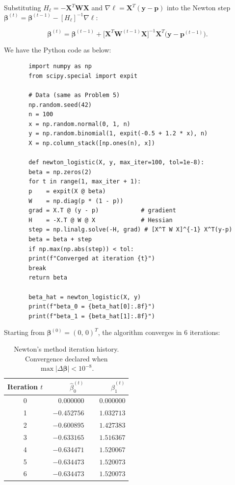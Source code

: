 \documentclass[letterpaper]{article}
\begin{document}
		
		Substituting $H_\ell = -\mathbf{X}^T\mathbf{W}\mathbf{X}$ and
		$\nabla\ell = \mathbf{X}^T(\mathbf{y}-\mathbf{p})$ into the Newton step
		$\boldsymbol{\beta}^{(t)} = \boldsymbol{\beta}^{(t-1)} - [H_\ell]^{-1}\nabla\ell$:
		
		\[
		\boldsymbol{\beta}^{(t)}
		= \boldsymbol{\beta}^{(t-1)}
		+ \bigl[\mathbf{X}^T\mathbf{W}^{(t-1)}\mathbf{X}\bigr]^{-1}
		\mathbf{X}^T\!\bigl(\mathbf{y}-\mathbf{p}^{(t-1)}\bigr).
		\]
		
		We have the Python code as below:

		\begin{lstlisting}
       import numpy as np
       from scipy.special import expit
       
       # Data (same as Problem 5)
       np.random.seed(42)
       n = 100
       x = np.random.normal(0, 1, n)
       y = np.random.binomial(1, expit(-0.5 + 1.2 * x), n)
       X = np.column_stack([np.ones(n), x])
       
       def newton_logistic(X, y, max_iter=100, tol=1e-8):
       beta = np.zeros(2)
       for t in range(1, max_iter + 1):
       p    = expit(X @ beta)
       W    = np.diag(p * (1 - p))
       grad = X.T @ (y - p)            # gradient
       H    = -X.T @ W @ X             # Hessian
       step = np.linalg.solve(-H, grad) # [X^T W X]^{-1} X^T(y-p)
       beta = beta + step
       if np.max(np.abs(step)) < tol:
       print(f"Converged at iteration {t}")
       break
       return beta
       
       beta_hat = newton_logistic(X, y)
       print(f"beta_0 = {beta_hat[0]:.8f}")
       print(f"beta_1 = {beta_hat[1]:.8f}")
		\end{lstlisting}

		
		Starting from $\boldsymbol{\beta}^{(0)} = (0,\,0)^T$, the algorithm converges
		in 6 iterations:
		
		\begin{table}[H]
			\centering
			\begin{tabular}{crr}
				\toprule
				Iteration $t$ & $\hat{\beta}_0^{(t)}$ & $\hat{\beta}_1^{(t)}$ \\
				\midrule
				0 & $\phantom{-}0.000000$ & $\phantom{-}0.000000$ \\
				1 & $-0.452756$ & $\phantom{-}1.032713$ \\
				2 & $-0.600895$ & $\phantom{-}1.427383$ \\
				3 & $-0.633165$ & $\phantom{-}1.516367$ \\
				4 & $-0.634471$ & $\phantom{-}1.520067$ \\
				5 & $-0.634473$ & $\phantom{-}1.520073$ \\
				6 & $-0.634473$ & $\phantom{-}1.520073$ \\
				\bottomrule
			\end{tabular}
			\caption{Newton's method iteration history. Convergence declared when
				$\max|\Delta\boldsymbol{\beta}| < 10^{-8}$.}
		\end{table}
\end{document}
